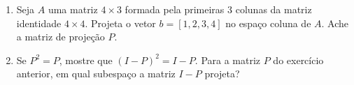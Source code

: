 \documentclass[leqno]{article}
\numberwithin{equation}{section}
\begin{document}
\begin{enumerate}
\begin{enumerate}
\begin{sol}
    \end{sol}

\end{enumerate}

\item Seja $A$ uma matriz $4 \times 3$ formada pela primeiras 3 colunas da matriz identidade $4 \times 4$. Projeta o vetor $b = [1,2,3,4]$ no espaço coluna de $A$. Ache a matriz de projeção $P$.

    \begin{sol}
        
    \end{sol}

\item Se $P^2 = P$, mostre que $(I - P)^2 = I - P$. Para a matriz $P$ do exercício anterior, em qual subespaço a matriz $I - P$ projeta?

    \begin{sol}
        
    \end{sol}

\end{enumerate}
\end{document}
